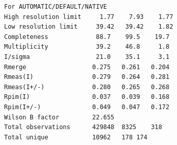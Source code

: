 \documentclass[slides,compress]{beamer}
\begin{document}
\begin{frame}[fragile]
\begin{verbatim}
For AUTOMATIC/DEFAULT/NATIVE
High resolution limit     1.77	  7.93	  1.77
Low resolution limit     39.42	 39.42	  1.82
Completeness          	 88.7	 99.5	 19.7
Multiplicity          	 39.2	 46.8	  1.8
I/sigma               	 21.0	 35.1	  3.1
Rmerge                	0.275	0.261	0.204
Rmeas(I)              	0.279	0.264	0.281
Rmeas(I+/-)           	0.280	0.265	0.268
Rpim(I)               	0.037	0.039	0.168
Rpim(I+/-)            	0.049	0.047	0.172
Wilson B factor       	22.655
Total observations    	429848	8325	318
Total unique          	10962	178	174
\end{verbatim}
\end{frame}


\end{document}
